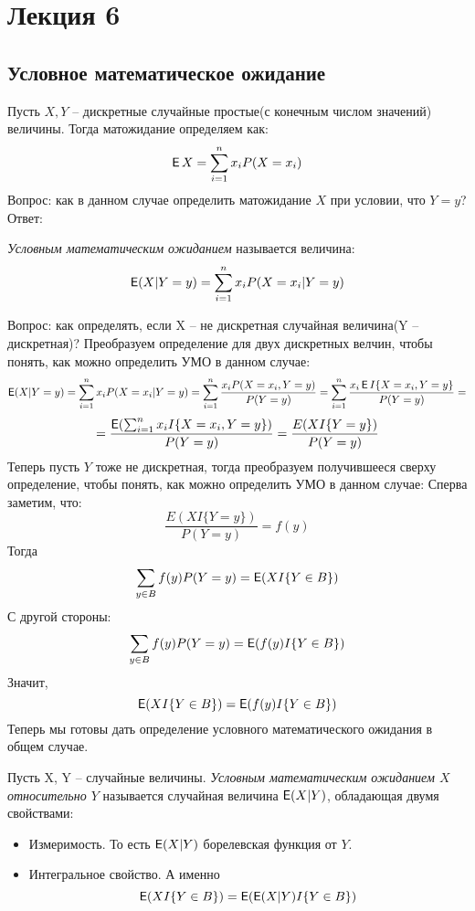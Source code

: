 \section{Лекция 6}

\subsection{Условное математическое ожидание}

Пусть $X, Y$ -- дискретные случайные простые(с конечным числом значений) величины. Тогда матожидание определяем как:
$$ \E X = \sum_{i = 1}^{n} x_iP(X = x_i)
$$
Вопрос: как в данном случае определить матожидание $X$ при условии, что $Y = y$?
Ответ:
\begin{definition}
\emph{Условным математическим ожиданием} называется величина:
$$
\E(X|Y = y) = \sum_{i = 1}^{n} x_iP(X = x_i|Y = y)
$$
\end{definition}
Вопрос: как определять, если X -- не дискретная случайная величина(Y -- дискретная)? Преобразуем определение для двух дискретных велчин, чтобы понять, как можно определить УМО в данном случае:
$$
\E(X|Y = y) = \sum_{i = 1}^{n} x_iP(X = x_i|Y = y) = \sum_{i = 1}^{n} \frac{x_iP(X = x_i, Y = y)}{P(Y = y)} = \sum_{i = 1}^{n} \frac{x_i\E I\{X = x_i, Y = y\}}{P(Y = y)} = $$
$$= \frac{\E (\sum_{i = 1}^{n} x_i I\{X = x_i, Y = y\})}{P(Y = y)} = \frac{E(XI\{Y = y\})}{P(Y = y)}
$$
Теперь пусть $Y$ тоже не дискретная, тогда преобразуем получившееся сверху определение, чтобы понять, как можно определить УМО в данном случае:
Сперва заметим, что:
$$ \frac{E(XI\{Y = y\})}{P(Y = y)} = f(y)
$$
Тогда
$$ \sum_{y \in B} f(y)P(Y = y) = \E (XI\{Y \in B\})
$$
С другой стороны: 
$$ \sum_{y \in B} f(y)P(Y = y) = \E(f(y)I\{Y \in B\})
$$
Значит, 
$$
\E (XI\{Y \in B\}) = \E(f(y)I\{Y \in B\})
$$
Теперь мы готовы дать определение условного математического ожидания в общем случае.
\begin{definition}
Пусть X, Y -- случайные величины. \emph{Условным математическим ожиданием $X$ относительно $Y$} называется случайная величина $\E(X|Y)$, обладающая двумя свойствами:
\begin{itemize}
    \item Измеримость. То есть $\E(X|Y)$ борелевская функция от $Y$.
    \item Интегральное свойство. А именно
    $$
    \E (XI\{Y \in B\}) = \E(\E(X|Y)I\{Y \in B\})
    $$
    \end{itemize}
\end{definition}

